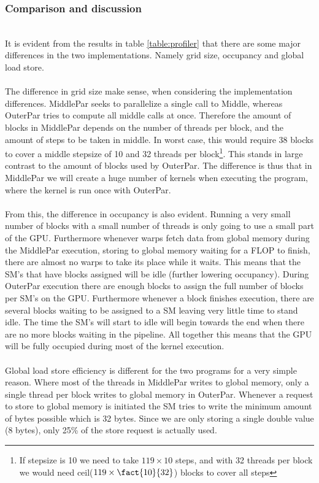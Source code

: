 \subsubsection{Comparison and discussion} \hfill \\
It is evident from the results in table \ref{table:profiler} that there are some major differences in the two implementations. Namely grid size, occupancy and global load store.
\\ \\
The difference in grid size make sense, when considering the implementation differences. MiddlePar seeks to parallelize a single call to Middle, whereas OuterPar tries to compute all middle calls at once. Therefore the amount of blocks in MiddlePar depends on the number of threads per block, and the amount of steps to be taken in middle. In worst case, this would require 38 blocks to cover a middle stepsize of 10 and 32 threads per block\footnote{If stepsize is 10 we need to take $119 \times 10$ steps, and with 32 threads per block we would need ceil($119 \times \fact{10}{32}$) blocks to cover all steps}. This stands in large contrast to the amount of blocks used by OuterPar. The difference is thus that in MiddlePar we will create a huge number of kernels when executing the program, where the kernel is run once with OuterPar.
\\ \\
From this, the difference in occupancy is also evident. Running a very small number of blocks with a small number of threads is only going to use a small part of the GPU. Furthermore whenever warps fetch data from global memory during the MiddlePar execution, storing to global memory waiting for a FLOP to finish, there are almost no warps to take its place while it waits. This means that the SM's that have blocks assigned will be idle (further lowering occupancy). During OuterPar execution there are enough blocks to assign the full number of blocks per SM's on the GPU. Furthermore whenever a block finishes execution, there are several blocks waiting to be assigned to a SM leaving very little time to stand idle. The time the SM's will start to idle will begin towards the end when there are no more blocks waiting in the pipeline. All together this means that the GPU will be fully occupied during most of the kernel execution.
\\ \\
Global load store efficiency is different for the two programs for a very simple reason. Where most of the threads in MiddlePar writes to global memory, only a single thread per block writes to global memory in OuterPar. Whenever a request to store to global memory is initiated the SM tries to write the minimum amount of bytes possible which is 32 bytes. Since we are only storing a single double value (8 bytes), only 25\% of the store request is actually used.


